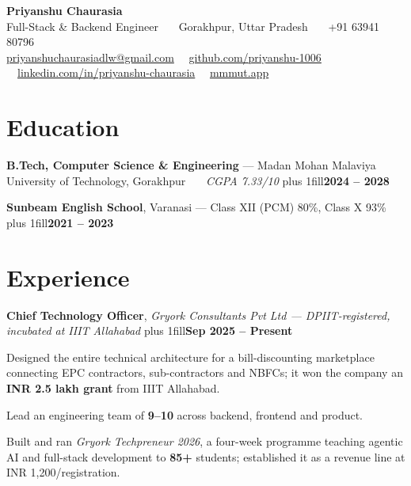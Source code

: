 \documentclass[a4paper,10pt]{article}
\newcommand{\myphone}{+91 63941 80796}
\newcommand{\mycgpa}{7.33}
\newcommand{\pushright}{\hskip 0pt plus 1fill\relax}
\newcommand{\entry}[3]{%
  \textbf{#1}, \textit{#2}\pushright\textbf{#3}%
}
\begin{document}
\begin{center}
  {\fontsize{18}{21}\selectfont\bfseries Priyanshu Chaurasia}\\[4pt]
  {\small Full-Stack \& Backend Engineer \ \textbar\ \ Gorakhpur, Uttar Pradesh \ \textbar\ \ \myphone}\\[2pt]
  {\small
    \href{mailto:priyanshuchaurasiadlw@gmail.com}{priyanshuchaurasiadlw@gmail.com} \ \textbar\
    \href{https://github.com/priyanshu-1006}{github.com/priyanshu-1006} \ \textbar\
    \href{https://www.linkedin.com/in/priyanshu-chaurasia-326979335/}{linkedin.com/in/priyanshu-chaurasia} \ \textbar\
    \href{https://mmmut.app}{mmmut.app}
  }
\end{center}
\vspace{-2pt}

\section{Education}
\textbf{B.Tech, Computer Science \& Engineering} --- Madan Mohan Malaviya University of
Technology, Gorakhpur \ \textbar\ \ \textit{CGPA \mycgpa/10}\pushright\textbf{2024 -- 2028}

\vspace{2pt}
\textbf{Sunbeam English School}, Varanasi --- Class XII (PCM) 80\%, Class X
93\%\pushright\textbf{2021 -- 2023}

\section{Experience}

\entry{Chief Technology Officer}{Gryork Consultants Pvt Ltd --- DPIIT-registered, incubated at IIIT Allahabad}{Sep 2025 -- Present}
\begin{bullets}
  \item Designed the entire technical architecture for a bill-discounting marketplace connecting EPC contractors, sub-contractors and NBFCs; it won the company an \textbf{INR 2.5 lakh grant} from IIIT Allahabad.
  \item Lead an engineering team of \textbf{9--10} across backend, frontend and product.
  \item Built and ran \textit{Gryork Techpreneur 2026}, a four-week programme teaching agentic AI and full-stack development to \textbf{85+} students; established it as a revenue line at INR 1,200/registration.
\end{bullets}
\end{document}
